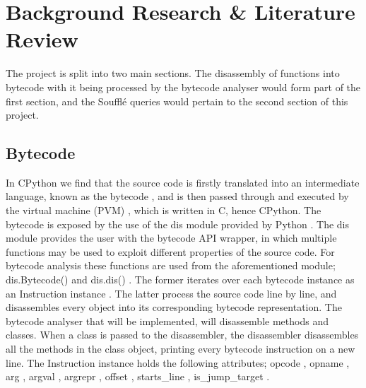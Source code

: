 \documentclass[12pt, a4paper]{report}
\theoremstyle{definition}
\theoremstyle{definition}%
\theoremstyle{definition}%
\theoremstyle{definition}%
\theoremstyle{definition}%
\theoremstyle{definition}%
\begin{document}
\chapter{Background Research \& Literature Review}

    \par The project is split into two main sections. The disassembly of functions into bytecode with it being processed by 
    the bytecode analyser would form part of the first section, and the Soufflé queries would pertain to the second section of 
    this project.

    \section{Bytecode} In CPython we find that the source code is firstly translated into an intermediate language, known as the {\selectfont 
    bytecode%
    },
    and is then passed through and executed by the virtual machine (PVM) \cite{ike2015inside}, which is written in C, hence CPython.
    The {\selectfont 
    bytecode%
    } is exposed by the use of the {\selectfont 
    dis%
    }
    module provided by Python \cite{disModule}. The {\selectfont 
    dis%
    } module provides the user
    with the bytecode API wrapper, in which multiple functions may be used to exploit different properties of the source code.
    For bytecode analysis these functions are used from the aforementioned module; 
    {\selectfont 
    dis.Bytecode()%
    } \cite{disModule} and {\selectfont 
    dis.dis()%
    } \cite{disModule}.
    The former iterates over each bytecode instance as an {\selectfont 
    Instruction%
    } instance \cite{disModule}. The latter process the source code line by line, and disassembles every object 
    into its corresponding bytecode representation. The bytecode analyser that will be implemented, will disassemble methods
    and classes. When a class is passed to the disassembler, the disassembler disassembles all the methods in the class object,
    printing every bytecode instruction on a new line.
    The {\selectfont 
    Instruction%
    } 
    instance holds the following attributes; 
    {\selectfont 
     opcode%
    },
    {\selectfont 
     opname%
    },
    {\selectfont 
     arg%
    },
    {\selectfont 
     argval%
    },
    {\selectfont 
     argrepr%
    },
    {\selectfont 
     offset%
    },
    {\selectfont 
     starts\_line%
    },
    {\selectfont 
     is\_jump\_target%
    } \cite{disModule}.
\end{document}
